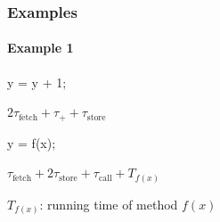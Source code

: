 \subsubsection{Examples}

\paragraph*{Example 1}
\noindent
\begin{minipage}{0.05\textwidth}
    \phantom{text}
\end{minipage}
\begin{minipage}{0.2\textwidth}
    \begin{tightcode}
y = y + 1;
    \end{tightcode}
\end{minipage}
\begin{minipage}{0.24\textwidth}
    \begin{mybox}[Periwinkle]{}
        $2\tau_{\text{fetch}} + \tau_{+}+  \tau_{\text{store}}$
    \end{mybox}
\end{minipage}

\noindent
\begin{minipage}{0.05\textwidth}
    \phantom{text}
\end{minipage}
\begin{minipage}{0.2\textwidth}
    \begin{tightcode}
y = f(x);
    \end{tightcode}
\end{minipage}
\begin{minipage}{0.3\textwidth}
    \begin{mybox}[Periwinkle]{}
        $\tau_{\text{fetch}} + 2\tau_{\text{store}} + \tau_{\text{call}} + T_{f(x)}$
    \end{mybox}
\end{minipage}
\begin{minipage}{0.4\textwidth}
    \begin{mybox}[Gray]{}
        $T_{f(x)}$: running time of method $f(x)$
    \end{mybox}
\end{minipage}

